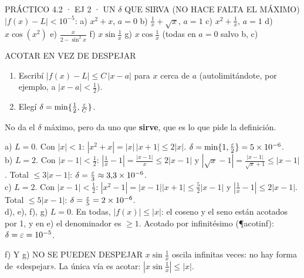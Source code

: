 \begin{enunciado}{PRÁCTICO 4.2 · EJ 2 · UN $\delta$ QUE SIRVA (NO HACE FALTA EL MÁXIMO)}
$|f(x)-L|<10^{-5}$: a) $x^2+x$, $a=0$ b) $\frac1x+\sqrt x$, $a=1$ c) $x^2+\frac1x$, $a=1$ d) $x\cos(x^2)$ e) $\frac x{2-\sin^2x}$ f) $x\sin\frac1x$ g) $x\cos\frac1x$ (todas en $a=0$ salvo b, c)
\end{enunciado}
\begin{metodo}{ACOTAR EN VEZ DE DESPEJAR}
\begin{enumerate}
\item Escribí $|f(x)-L|\le C\,|x-a|$ para $x$ cerca de $a$ (autolimitándote, por ejemplo, a $|x-a|<\frac12$).
\item Elegí $\delta=\min\{\frac12,\frac{\varepsilon} C\}$.
\end{enumerate}
No da el $\delta$ máximo, pero da uno que \textbf{sirve}, que es lo que pide la definición.
\end{metodo}
a) $L=0$. Con $|x|<1$: $|x^2+x|=|x|\,|x+1|\le2|x|$. $\delta=\min\{1,\frac{\varepsilon}2\}=5\times10^{-6}$.\\[2pt]
b) $L=2$. Con $|x-1|<\frac12$: $\left|\frac1x-1\right|=\frac{|x-1|}x\le2|x-1|$ y $|\sqrt x-1|=\frac{|x-1|}{\sqrt x+1}\le|x-1|$. Total $\le3|x-1|$: $\delta=\frac{\varepsilon}3\approx3{,}3\times10^{-6}$.\\[2pt]
c) $L=2$. Con $|x-1|<\frac12$: $|x^2-1|=|x-1||x+1|\le\frac52|x-1|$ y $\left|\frac1x-1\right|\le2|x-1|$. Total $\le5|x-1|$: $\delta=\frac{\varepsilon}5=2\times10^{-6}$.\\[2pt]
d), e), f), g) $L=0$. En todas, $|f(x)|\le|x|$: el coseno y el seno están acotados por 1, y en e) el denominador es $\ge1$. Acotado por infinitésimo (\P{acotinf}): $\delta=\varepsilon=10^{-5}$.
\begin{trampa}{f) Y g) NO SE PUEDEN DESPEJAR}
$x\sin\frac1x$ oscila infinitas veces: no hay forma de «despejar». La única vía es acotar: $|x\sin\frac1x|\le|x|$.
\end{trampa}

